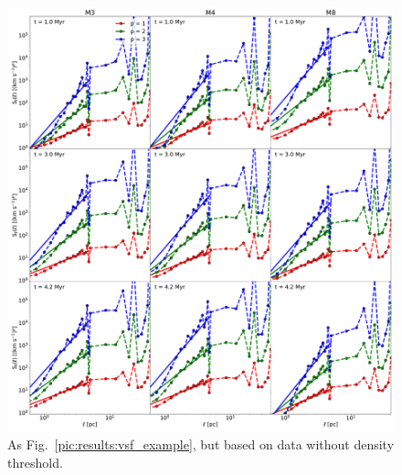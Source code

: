 \documentclass{aa}		%
\begin{document}
 	
\begin{figure}
    \centering
    \includegraphics[width=\textwidth]{app_examples_woutthres_s_l.pdf}
    \caption{
        As Fig.~\ref{pic:results:vsf_example}, but based on data without density threshold.
    }
    \label{pic:appInertial:examples_without_threshold_s_vs_l}
\end{figure}
 	
\end{document}
